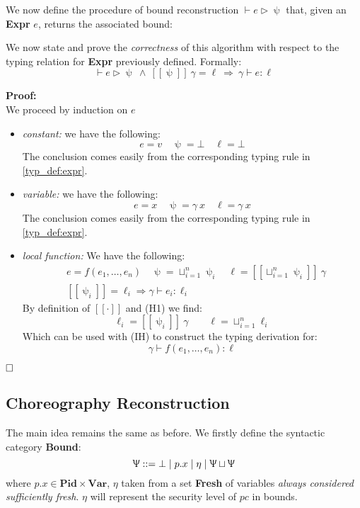 \documentclass[12pt,a4paper,twoside]{book}
\newcommand{\llbracket}{[\![}
\newcommand{\rrbracket}{]\!]}
\newcommand{\qed}{\hfill\square}
\begin{document}
We now define the procedure of bound reconstruction $\vdash e \rhd \uppsi$ that, given an \textbf{Expr} $e$, returns the associated bound:

We now state and prove the \emph{correctness} of this algorithm with respect to the typing relation for \textbf{Expr} previously defined. Formally:
\begin{equation}\label{rec:expr_corr}
\vdash e \rhd \uppsi~\land~\llbracket \uppsi \rrbracket~\gamma = \ell~\Longrightarrow~\gamma \vdash e: \ell
\end{equation}

\noindent\textbf{Proof:}\\
We proceed by induction on $e$
\begin{itemize}
\item \emph{constant:} we have the following:
$$
e=v\quad\uppsi=\bot\quad\ell=\bot
$$
The conclusion comes easily from the corresponding typing rule in \ref{typ_def:expr}.
\item \emph{variable:} we have the following:
$$
e=x\quad\uppsi=\gamma~x\quad\ell=\gamma~x
$$
The conclusion comes easily from the corresponding typing rule in \ref{typ_def:expr}.
\item \emph{local function:} We have the following:
\begin{align}
&e=f(e_1, \ldots, e_n)\quad\uppsi=\sqcup^n_{i=1}\uppsi_i
\quad \ell= \llbracket\sqcup^n_{i=1}\uppsi_i \rrbracket~\gamma \tag{H1}\\
&\llbracket \uppsi_i \rrbracket = \ell_i \Rightarrow \gamma \vdash e_i:\ell_i\tag{IH}
\end{align}
By definition of $\llbracket \cdot \rrbracket$ and (H1) we find:
$$
\ell_i = \llbracket \uppsi_i\rrbracket~\gamma \quad\quad \ell = \sqcup^n_{i=1}\ell_i
$$
Which can be used with (IH) to construct the typing derivation for:
$$
\gamma \vdash f(e_1, \ldots, e_n) : \ell
$$
\end{itemize}
$\qed$

\subsection{Choreography Reconstruction}
The main idea remains the same as before.
We firstly define the syntactic category \textbf{Bound}:
$$
\Uppsi ::= \bot \mid p.x \mid \eta \mid \Uppsi \sqcup \Uppsi
$$
where $p.x \in \textbf{Pid} \times \textbf{Var}$, $\eta$ taken from a set \textbf{Fresh} of variables \emph{always considered sufficiently fresh}. $\eta$ will represent the security level of $pc$ in bounds.
\end{document}
